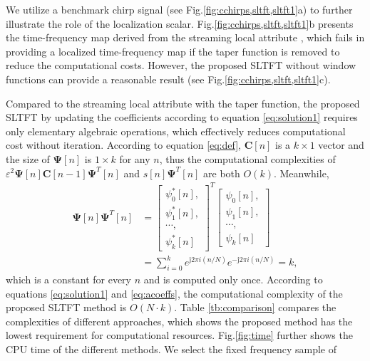 We utilize a benchmark chirp signal (see Fig.\ref{fig:cchirps,sltft,sltft1}a)
to further illustrate the role of the localization
scalar. Fig.\ref{fig:cchirps,sltft,sltft1}b presents the time-frequency map
derived from the streaming local attribute \cite[]{Geng24}, which
fails in providing a localized time-frequency map if the taper
function is removed to reduce the computational costs. However, the
proposed SLTFT without window functions can provide a reasonable
result (see Fig.\ref{fig:cchirps,sltft,sltft1}c).

Compared to the streaming local attribute with the taper function, the
proposed SLTFT by updating the coefficients according to
equation \ref{eq:solution1} requires only elementary algebraic
operations, which effectively reduces computational cost without
iteration. According to equation \ref{eq:def}, $\mathbf{C}[n]$ is a
$k\times 1$ vector and the size of $\mathbf{\Psi}[n]$ is $1\times k$
for any $n$, thus the computational complexities of
$\varepsilon^2\mathbf{\Psi}[n]\mathbf{C}[n-1]\mathbf{\Psi}^T[n]$ and
$s[n]\mathbf{\Psi}^T[n]$ are both $O(k)$. Meanwhile,
\begin{equation}
	\label{eq:constant}
	\begin{aligned}
		\mathbf{\Psi}[n]\mathbf{\Psi}^T[n] &=
		\left[\begin{array}{c}
			\psi^{*}_0[n], \\ \psi^{*}_1[n], \\\cdots, \\ \psi^{*}_k[n]
		\end{array}\right]^T
		\left[\begin{array}{c}
			{\psi_0[n]}, \\ {\psi_1[n]}, \\ \cdots, \\ {\psi_k[n]}
		\end{array}\right] \\
		&=\sum_{i=0}^{k}{e^{\text{j}2\pi i (n/N)}e^{-\text{j}2\pi i (n/N)}}=k, 
	\end{aligned}
\end{equation}
\noindent which is a constant for every $n$ and is computed only once.
According to equations \ref{eq:solution1} and \ref{eq:acoeffs}, the
computational complexity of the proposed SLTFT method is $O(N\cdot
k)$. Table \ref{tb:comparison} compares the complexities of different
approaches, which shows the proposed method has the lowest requirement
for computational resources. Fig.\ref{fig:time} further shows the CPU
time of the different methods. We select the fixed frequency sample of
